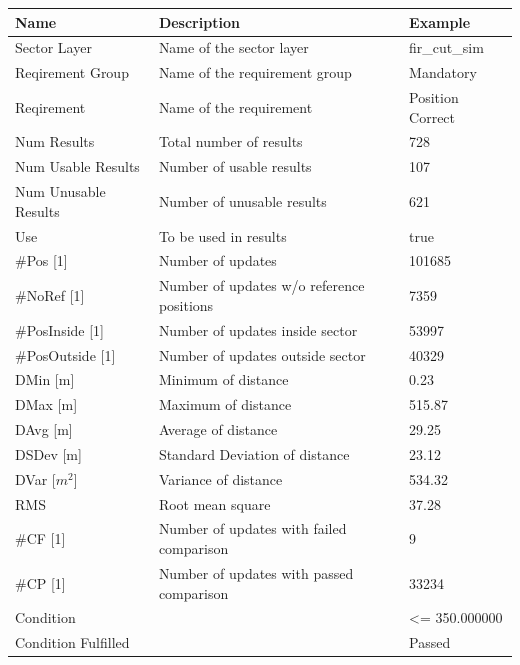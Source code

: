 \begin{center}
 \begin{table}[H]
  \begin{tabularx}{\textwidth}{ | l | X |  l | }
    \hline
    \textbf{Name} & \textbf{Description} & \textbf{Example} \\ \hline
    Sector Layer & Name of the sector layer & fir\_cut\_sim \\ \hline
    Reqirement Group & Name of the requirement group & Mandatory \\ \hline
    Reqirement & Name of the requirement & Position Correct \\ \hline
    Num Results & Total number of results & 728 \\ \hline
    Num Usable Results & Number of usable results & 107 \\ \hline
    Num Unusable Results & Number of unusable results & 621 \\ \hline
    Use & To be used in results & true \\ \hline
    \#Pos [1] & Number of updates & 101685 \\ \hline
    \#NoRef [1] & Number of updates w/o reference positions & 7359 \\ \hline
    \#PosInside [1] & Number of updates inside sector & 53997 \\ \hline
    \#PosOutside [1] & Number of updates outside sector & 40329 \\ \hline
    DMin [m] & Minimum of distance & 0.23 \\ \hline
    DMax [m] & Maximum of distance & 515.87 \\ \hline
    DAvg [m] & Average of distance & 29.25 \\ \hline
    DSDev [m] & Standard Deviation of distance & 23.12 \\ \hline
    DVar [$m^2$] & Variance of distance & 534.32 \\ \hline
    RMS & Root mean square & 37.28 \\ \hline
    \#CF [1] & Number of updates with failed comparison & 9 \\ \hline
    \#CP [1] & Number of updates with passed comparison  & 33234 \\ \hline
    Condition &  & <= 350.000000 \\ \hline
    Condition Fulfilled &  & Passed \\ \hline
\end{tabularx}
\end{table}
\end{center}

